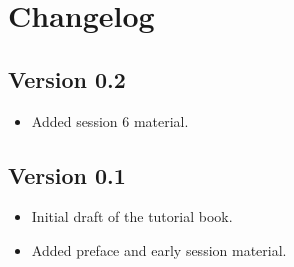 \chapter*{Changelog}


\section*{Version 0.2}

\begin{itemize}
    \item Added session 6 material.
\end{itemize}


\section*{Version 0.1}

\begin{itemize}
    \item Initial draft of the tutorial book.
    \item Added preface and early session material.
\end{itemize}
